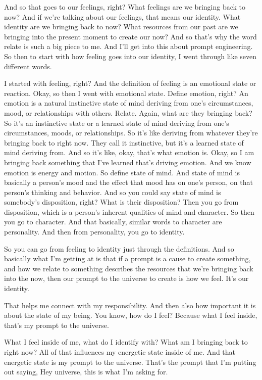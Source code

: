 \documentclass{article}
\begin{document}
And so that goes to our feelings, right? What feelings are we bringing
back to now? And if we're talking about our feelings, that means our identity. What identity
are we bringing back to now? What resources from our past are we bringing into the present moment
to create our now? And so that's why the word relate is such a big piece to me. And I'll get
into this about prompt engineering. So then to start with how feeling goes into our identity,
I went through like seven different words. 

I started with feeling, right? And the definition of feeling is an emotional state or reaction. Okay, so then I went with emotional state. Define emotion, right? An emotion is a natural instinctive state of mind deriving from one's circumstances, mood, or relationships with others. Relate. Again, what are they bringing back? So it's an instinctive state or a learned state of mind deriving from one's circumstances, moods, or relationships. So it's like deriving from whatever they're bringing back to right now. They call it instinctive, but it's a learned state of mind deriving from. And so it's like, okay, that's what emotion is. Okay, so I am bringing back something that I've learned that's driving emotion. And we know emotion is energy and motion. So define state of mind. And state of mind is basically a person's mood and the effect that mood has on one's person, on that person's thinking and behavior. And so you could say state of mind is somebody's disposition, right? What is their disposition? Then you go from disposition, which is a person's inherent qualities of mind and character. So then you go to character. And that basically,
similar words to character are personality. And then from personality, you go to identity.

So you can go from feeling to identity just through the definitions. And so basically what
I'm getting at is that if a prompt is a cause to create something, and how we relate to something
describes the resources that we're bringing back into the now, then our prompt to the universe to create is how we feel. It's our identity. 

That helps me connect with my responsibility. And then also how important it is about the state of my being. You know, how do I feel? Because what I feel inside, that's my prompt to the universe. 

What I feel inside of me, what do I identify with? What am I bringing back to right now? All of that influences my energetic state inside of me. And that energetic state is my prompt to the universe. That's the prompt that I'm putting out saying, Hey universe, this is what I'm asking for. 
\end{document}
